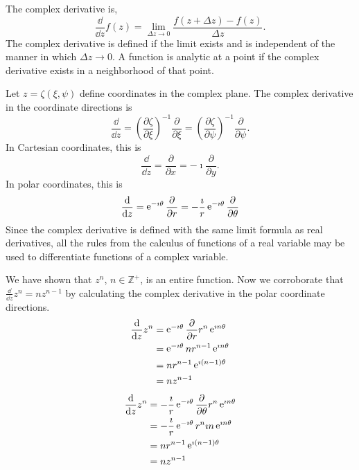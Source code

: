 \begin{Result}
  \label{result complex derivative}
  The complex derivative is,
  \[ 
  \frac{\dd}{\dd z} f(z) 
  = \lim_{\Delta z \to 0}\frac{f(z + \Delta z) - f(z)}{\Delta z}.
  \]
  The complex derivative is defined if the limit exists and is independent of
  the manner in which $\Delta z \to 0$.  A function is analytic at a 
  point if the complex derivative exists in a neighborhood of that point.

  Let $z = \zeta(\xi, \psi)$ define coordinates in the complex plane.  
  The complex derivative in the coordinate directions is
  \[
  \frac{\dd}{\dd z}
  = \left( \frac{\partial \zeta}{\partial \xi} \right)^{-1} \frac{\partial}{\partial \xi}
  = \left( \frac{\partial \zeta}{\partial \psi} \right)^{-1} \frac{\partial}{\partial \psi}.
  \]
  In Cartesian coordinates, this is
  \[
  \frac{\dd}{\dd z} = \frac{\partial}{\partial x} = -\imath \frac{\partial}{\partial y}.
  \]
  In polar coordinates, this is
  \[
  \frac{\mathrm{d}}{\mathrm{d} z} = \mathop{\mathrm{e}}\nolimits^{-\imath \theta} \frac{\partial}{\partial r} 
  = - \frac{\imath}{r} \mathop{\mathrm{e}}\nolimits^{-\imath \theta} \frac{\partial}{\partial \theta}
  \]
  Since the complex derivative is defined with the same limit formula as 
  real derivatives, all the rules from the calculus of functions of a real
  variable may be used to differentiate functions of a complex variable.
\end{Result}






\begin{Example}
  We have shown that $z^n$, $n \in \mathbb{Z}^+$, is an entire function.
  Now we corroborate that $\frac{\dd}{\dd z} z^n = n z^{n-1}$
  by calculating the complex derivative in the polar coordinate directions.
  \begin{align*}
    \frac{\mathrm{d}}{\mathrm{d} z} z^n
    &= \mathop{\mathrm{e}}\nolimits^{-\imath \theta} \frac{\partial}{\partial r} r^n \mathop{\mathrm{e}}\nolimits^{\imath n \theta} 
    \\
    &= \mathop{\mathrm{e}}\nolimits^{-\imath \theta} n r^{n-1} \mathop{\mathrm{e}}\nolimits^{\imath n \theta} 
    \\
    &= n r^{n-1} \mathop{\mathrm{e}}\nolimits^{\imath (n-1) \theta} 
    \\
    &= n z^{n-1}
  \end{align*}
  \begin{align*}
    \frac{\mathrm{d}}{\mathrm{d} z} z^n
    &= - \frac{\imath}{r} \mathop{\mathrm{e}}\nolimits^{-\imath \theta} \frac{\partial}{\partial \theta} r^n \mathop{\mathrm{e}}\nolimits^{\imath n \theta} 
    \\
    &= - \frac{\imath}{r} \mathop{\mathrm{e}}\nolimits^{-\imath \theta} r^n \imath n \mathop{\mathrm{e}}\nolimits^{\imath n \theta} 
    \\
    &= n r^{n-1} \mathop{\mathrm{e}}\nolimits^{\imath (n-1) \theta} 
    \\
    &= n z^{n-1}
  \end{align*}
\end{Example}





